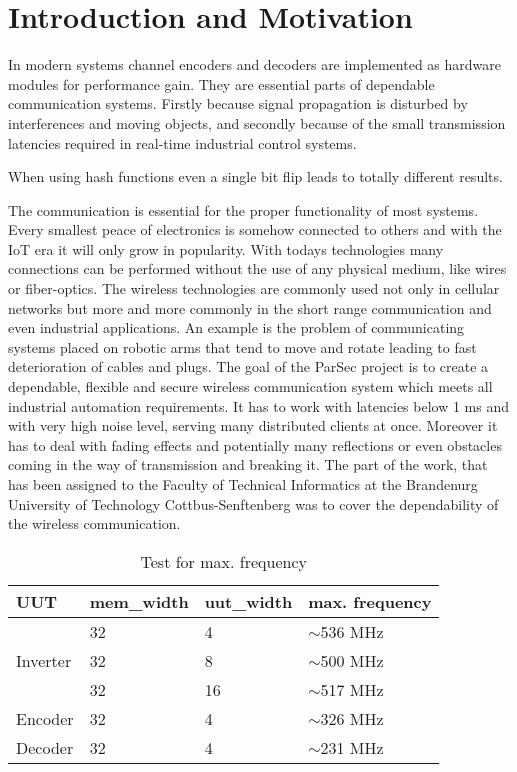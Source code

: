 \chapter{Introduction and Motivation} \label{ch:int}



In modern systems channel encoders and decoders are implemented as hardware modules for performance gain. They are essential parts of dependable communication systems. Firstly because signal propagation is disturbed by interferences and moving objects, and secondly because of the small transmission latencies required in real-time industrial control systems.

When using hash functions even a single bit flip leads to totally different results.

The communication is essential for the proper functionality of most systems. Every smallest peace of electronics is somehow connected to others and with the IoT era it will only grow in popularity. With todays technologies many connections can be performed without the use of any physical medium, like wires or fiber-optics. The wireless technologies are commonly used not only in cellular networks but more and more commonly in the short range communication and even industrial applications. An example is the problem of communicating systems placed on robotic arms that tend to move and rotate leading to fast deterioration of cables and plugs.
The goal of the ParSec project is to create a dependable, flexible and secure wireless communication system which meets all industrial automation requirements. It has to work with latencies below 1 ms and with very high noise level, serving many distributed clients at once. Moreover it has to deal with fading effects and potentially many reflections or even obstacles coming in the way of transmission and breaking it. The part of the work, that has been assigned to the Faculty of Technical Informatics at the Brandenurg University of Technology Cottbus-Senftenberg was to cover the dependability of the wireless communication. 

\begin{table}[]
\centering
\caption{Test for max. frequency}
\label{tab:max_freq}
\begin{tabular}{@{}llll@{}}
\toprule
UUT                       &mem\_width   &uut\_width &max. frequency \\ 
\midrule
\multirow{3}{*}{Inverter} &32           &4       & $\sim$536 MHz\\ 
                          & 32          & 8      & $\sim$500 MHz \\  
                          & 32          & 16     & $\sim$517 MHz \\ 
\midrule
Encoder                   & 32          & 4      & $\sim$326 MHz \\ 
\midrule
Decoder                   & 32          & 4      & $\sim$231 MHz \\  
\bottomrule
\end{tabular}
\end{table}
